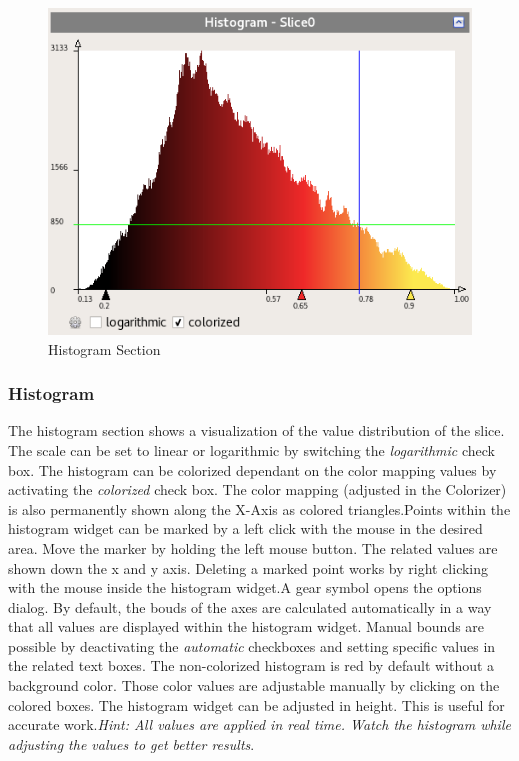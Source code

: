 \begin{figure}[h!]
  \centering
  \includegraphics[scale=0.5]{img/2d/histogram}
  \caption{Histogram Section}
\end{figure}  

\subsubsection{Histogram}

The histogram section shows a visualization of the value distribution of the slice. The scale can be set to linear or logarithmic by switching the \emph{logarithmic} check box. 
\newline The histogram can be colorized dependant on the color mapping values by activating the \emph{colorized} check box. The color mapping (adjusted in the Colorizer) is also permanently shown along the X-Axis as colored triangles.\newline Points within the histogram widget can be marked by a left click with the mouse in the desired area. Move the marker by holding the left mouse button. The related values are shown down the x and y axis. Deleting a marked point works by right clicking with the mouse inside the histogram widget.\newline A gear symbol opens the options dialog. By default, the bouds of the axes are calculated automatically in a way that all values are displayed within the histogram widget. Manual bounds are possible by deactivating the \emph{automatic} checkboxes and setting specific values in the related text boxes. \newline The non-colorized histogram is red by default without a background color. Those color values are adjustable manually by clicking on the colored boxes. \newline The histogram widget can be adjusted in height. This is useful for accurate work.\newline \emph{Hint: All values are applied in real time. Watch the histogram while adjusting the values to get better results}.

